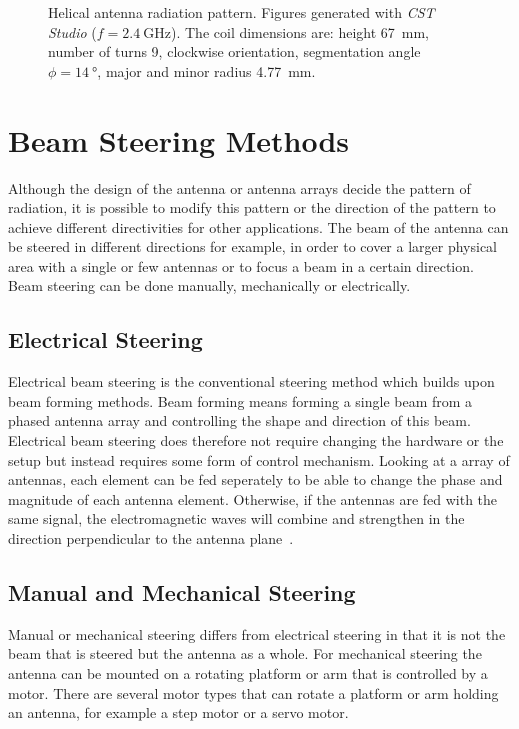 \begin{figure}[H]
\begin{minipage}{0.45\textwidth}
    \end{minipage}
    \caption{Helical antenna radiation pattern. Figures generated with \textit{CST Studio} ($f=\SI{2.4}{\giga\hertz}$). The coil dimensions are: height \SI{67}{\milli\meter}, number of turns \SI{9}{}, clockwise orientation, segmentation angle $\phi=\SI{14}{\degree}$, major and minor radius \SI{4.77}{\milli\meter}.}
    \label{fig:helical_1}
\end{figure}

\section{Beam Steering Methods}
Although the design of the antenna or antenna arrays decide the pattern of radiation, it is possible to modify this pattern or the direction of the pattern to achieve different directivities for other applications. The beam of the antenna can be steered in different directions for example, in order to cover a larger physical area with a single or few antennas or to focus a beam in a certain direction. Beam steering can be done manually, mechanically or electrically.

\subsection{Electrical Steering}
Electrical beam steering is the conventional steering method which builds upon beam forming methods. Beam forming means forming a single beam from a phased antenna array and controlling the shape and direction of this beam. Electrical beam steering does therefore not require changing the hardware or the setup but instead requires some form of control mechanism. Looking at a array of antennas, each element can be fed seperately to be able to change the phase and magnitude of each antenna element. Otherwise, if the antennas are fed with the same signal, the electromagnetic waves will combine and strengthen in the direction perpendicular to the antenna plane~\cite{beamsteering}.

\subsection{Manual and Mechanical Steering}
Manual or mechanical steering differs from electrical steering in that it is not the beam that is steered but the antenna as a whole. For mechanical steering the antenna can be mounted on a rotating platform or arm that is controlled by a motor. There are several motor types that can rotate a platform or arm holding an antenna, for example a step motor or a servo motor. 

